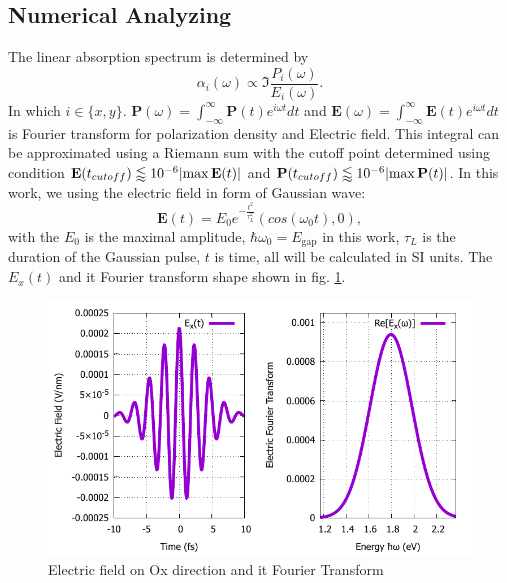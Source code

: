 \documentclass[12pt,english,a4paper]{article}
\begin{document}
\subsection{Numerical Analyzing}
\quad The linear absorption spectrum is determined by
\begin{equation}
	\alpha_{i}(\omega) \propto \Im{\frac{P_i(\omega)}{E_i(\omega)}}.
	\label{absorpt}
\end{equation}
\quad In which $i \in \{x,y\}$. $\textbf{P}(\omega)= \int_{-\infty}^{\infty}\textbf{P}(t) e^{i\omega t} dt$ and $\textbf{E}(\omega) = \int_{-\infty}^{\infty}\textbf{E}(t) e^{i\omega t} dt$ is Fourier transform for polarization density and Electric field. This integral can be approximated using a Riemann sum with the cutoff point determined using condition $\textbf{E}(t_{cutoff}) \lessapprox 10^{-6} \abs{\max{\textbf{E}(t)}}$ and $\textbf{P}(t_{cutoff}) \lessapprox 10^{-6} \abs{\max{\textbf{P}(t)}}$. In this work, we using the electric field in form of Gaussian wave:
\begin{equation}
	\textbf{E}(t) = E_0 e^{-\frac{t^2}{\tau_L^2}}(cos(\omega_0t), 0),
\end{equation} 
with the $E_0$ is the maximal amplitude, $\hbar\omega_0 = E_{\mathrm{gap}}$ in this work, $\tau_L$ is the duration of the Gaussian pulse, $t$ is time,  all will be calculated in SI units. The $E_x(t)$ and it Fourier transform shape shown in fig. \ref{Et}.\\
\begin{figure}
	\begin{center}
\includegraphics[width = 0.75\linewidth]{Images/EAt.pdf}
\caption{Electric field on Ox direction and it Fourier Transform}
\label{Et}
	\end{center}
\end{figure}
\end{document}

